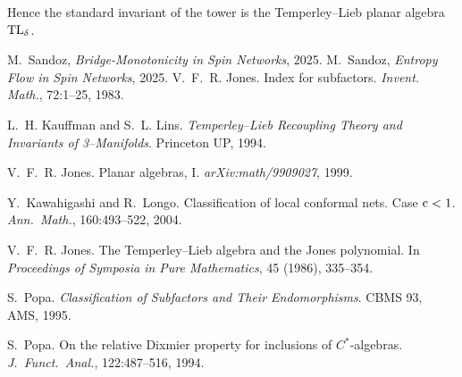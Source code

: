 \documentclass[11pt]{article}
\begin{document}
Hence the standard invariant of the tower is the Temperley--Lieb
planar algebra ${\rm TL}_\delta$.



\begin{thebibliography}{9}
 M.~Sandoz, \emph{Bridge-Monotonicity in Spin Networks}, 2025.
 M.~Sandoz, \emph{Entropy Flow in Spin Networks}, 2025.
V.~F.~R. Jones.
\newblock Index for subfactors.
\newblock \emph{Invent. Math.}, 72:1–25, 1983.

L.~H. Kauffman and S.~L. Lins.
\newblock \emph{Temperley–Lieb Recoupling Theory and Invariants of 3–Manifolds}.
\newblock Princeton UP, 1994.

V.~F.~R. Jones.
\newblock Planar algebras, I.
\newblock \emph{arXiv:math/9909027}, 1999.

Y.~Kawahigashi and R.~Longo.
\newblock Classification of local conformal nets.  Case ${\rm c}<1$.
\newblock \emph{Ann.\ Math.}, 160:493–522, 2004.

V.~F.~R. Jones.
\newblock The Temperley–Lieb algebra and the Jones polynomial.
\newblock In \emph{Proceedings of Symposia in Pure Mathematics}, 45 (1986), 335–354.

S.~Popa.
\newblock \emph{Classification of Subfactors and Their Endomorphisms}.
\newblock CBMS 93, AMS, 1995.

S.~Popa.
\newblock On the relative Dixmier property for inclusions of $C^{\ast}$‐algebras.
\newblock \emph{J.\ Funct.\ Anal.}, 122:487–516, 1994.

\end{thebibliography}
\end{document}
